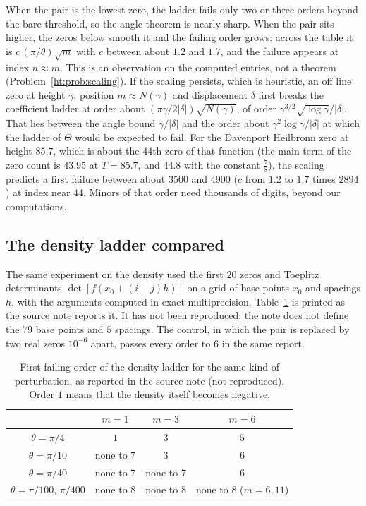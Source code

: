 When the pair is the lowest zero, the ladder fails only two or three orders beyond the bare threshold, so the angle theorem is nearly sharp. When the pair sits higher, the zeros below smooth it and the failing order grows: across the table it is $c\,(\pi/\theta)\sqrt m$ with $c$ between about $1.2$ and $1.7$, and the failure appears at index $n\approx m$. This is an observation on the computed entries, not a theorem (Problem~\ref{ht:prob:scaling}). If the scaling persists, which is heuristic, an off line zero at height $\gamma$, position $m\approx N(\gamma)$ and displacement $\delta$ first breaks the coefficient ladder at order about $(\pi\gamma/2|\delta|)\sqrt{N(\gamma)}$, of order $\gamma^{3/2}\sqrt{\log\gamma}/|\delta|$. That lies between the angle bound $\gamma/|\delta|$ and the order about $\gamma^2\log\gamma/|\delta|$ at which the ladder of $\Theta$ would be expected to fail. For the Davenport Heilbronn zero at height $85.7$, which is about the $44$th zero of that function (the main term of the zero count is $43.95$ at $T=85.7$, and $44.8$ with the constant $\frac78$), the scaling predicts a first failure between about $3500$ and $4900$ ($c$ from $1.2$ to $1.7$ times $2894$) at index near $44$. Minors of that order need thousands of digits, beyond our computations.

\subsection{The density ladder compared}\label{ht:sec:denscmp}

The same experiment on the density used the first $20$ zeros and Toeplitz determinants $\det[f(x_0+(i-j)h)]$ on a grid of base points $x_0$ and spacings $h$, with the arguments computed in exact multiprecision. Table~\ref{ht:tab:denscmp} is printed as the source note reports it. It has not been reproduced: the note does not define the $79$ base points and $5$ spacings. %
The control, in which the pair is replaced by two real zeros $10^{-6}$ apart, passes every order to $6$ in the same report.

\begin{table}[h]
\centering
\begin{tabular}{cccc}
\toprule
 & $m=1$ & $m=3$ & $m=6$\\
\midrule
$\theta=\pi/4$ & $1$ & $3$ & $5$\\
$\theta=\pi/10$ & none to $7$ & $3$ & $6$\\
$\theta=\pi/40$ & none to $7$ & none to $7$ & $6$\\
$\theta=\pi/100$, $\pi/400$ & none to $8$ & none to $8$ & none to $8$ ($m=6,11$)\\
\bottomrule
\end{tabular}
\caption{First failing order of the density ladder for the same kind of perturbation, as reported in the source note (not reproduced). Order $1$ means that the density itself becomes negative.}
\label{ht:tab:denscmp}
\end{table}

